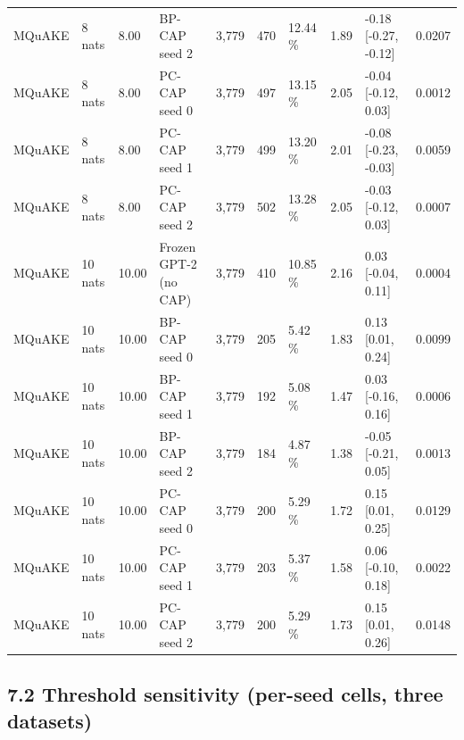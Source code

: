 \documentclass[10pt,a4paper]{article}
\begin{document}
\begin{center}
\begin{tabularx}{\textwidth}{@{}p{}XXXXXXXXX@{}}
MQuAKE & 8 nats & 8.00 & BP-CAP seed 2 & 3,779 & 470 & 12.44 \% & 1.89 & -0.18 [-0.27, -0.12] & 0.0207 \\
MQuAKE & 8 nats & 8.00 & PC-CAP seed 0 & 3,779 & 497 & 13.15 \% & 2.05 & -0.04 [-0.12, 0.03] & 0.0012 \\
MQuAKE & 8 nats & 8.00 & PC-CAP seed 1 & 3,779 & 499 & 13.20 \% & 2.01 & -0.08 [-0.23, -0.03] & 0.0059 \\
MQuAKE & 8 nats & 8.00 & PC-CAP seed 2 & 3,779 & 502 & 13.28 \% & 2.05 & -0.03 [-0.12, 0.03] & 0.0007 \\
MQuAKE & 10 nats & 10.00 & Frozen GPT-2 (no CAP) & 3,779 & 410 & 10.85 \% & 2.16 & 0.03 [-0.04, 0.11] & 0.0004 \\
MQuAKE & 10 nats & 10.00 & BP-CAP seed 0 & 3,779 & 205 & 5.42 \% & 1.83 & 0.13 [0.01, 0.24] & 0.0099 \\
MQuAKE & 10 nats & 10.00 & BP-CAP seed 1 & 3,779 & 192 & 5.08 \% & 1.47 & 0.03 [-0.16, 0.16] & 0.0006 \\
MQuAKE & 10 nats & 10.00 & BP-CAP seed 2 & 3,779 & 184 & 4.87 \% & 1.38 & -0.05 [-0.21, 0.05] & 0.0013 \\
MQuAKE & 10 nats & 10.00 & PC-CAP seed 0 & 3,779 & 200 & 5.29 \% & 1.72 & 0.15 [0.01, 0.25] & 0.0129 \\
MQuAKE & 10 nats & 10.00 & PC-CAP seed 1 & 3,779 & 203 & 5.37 \% & 1.58 & 0.06 [-0.10, 0.18] & 0.0022 \\
MQuAKE & 10 nats & 10.00 & PC-CAP seed 2 & 3,779 & 200 & 5.29 \% & 1.73 & 0.15 [0.01, 0.26] & 0.0148 \\
\bottomrule
\end{tabularx}
\end{center}



\subsection*{7.2 Threshold sensitivity (per-seed cells, three datasets)}
\end{document}

